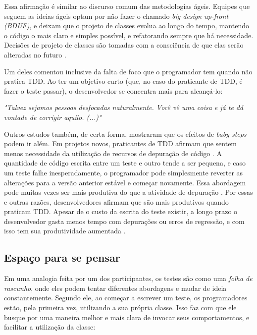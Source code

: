 Essa afirmação é similar ao discurso comum das metodologias ágeis.
Equipes que seguem as ideias ágeis optam por não fazer o chamado \textit{big design up-front (BDUF)},
e deixam que o projeto de classes evolua ao longo do tempo, mantendo o código o mais claro e
simples possível, e refatorando sempre que há necessidade. Decisões de
projeto de classes são tomadas com a consciência de que elas serão alteradas no futuro
\cite{is-design-dead}.

Um deles comentou inclusive da falta de foco que o programador tem quando não pratica TDD.
Ao ter um objetivo curto (que, no caso do praticante de TDD, é fazer o teste passar), o
desenvolvedor se concentra mais para alcançá-lo:

\begin{framed}
\textit{"Talvez sejamos pessoas desfocadas naturalmente. Você vê uma coisa e já te dá vontade
de corrigir aquilo. (...)"}
\end{framed}

Outros estudos também, de certa forma, mostraram que os efeitos de \textit{baby steps}
podem ir além.
Em projetos novos, praticantes de TDD afirmam que sentem menos necessidade da
utilização de recursos de depuração de código \cite{george-williams-experiment} 
\cite{janzen-arch-improvement}. 
A quantidade de código
escrita entre um teste e outro tende a ser pequena, e caso um teste falhe
inesperadamente, o programador pode simplesmente reverter as alterações para a 
versão anterior estável e começar novamente. Essa abordagem pode muitas vezes
ser mais produtiva do que a atividade de depuração 
\cite{janzen-arch-improvement}. Por essas e outras razões, desenvolvedores afirmam 
que são mais produtivos quando praticam TDD. Apesar de o custo da escrita do teste
existir, a longo prazo o desenvolvedor gasta menos tempo com depurações ou 
erros de regressão, e com isso tem sua produtividade aumentada
\cite{george-e-williams}.

\subsection{Espaço para se pensar}

Em uma analogia feita por um dos participantes, os testes são como uma 
\textit{folha de rascunho}, 
onde eles podem tentar diferentes abordagens e mudar de ideia constantemente. Segundo ele,
ao começar a escrever um teste, os programadores estão, pela primeira vez, utilizando a sua 
própria classe. Isso faz com que ele busque por uma maneira melhor e mais clara de invocar
seus comportamentos, e facilitar a utilização da classe:

